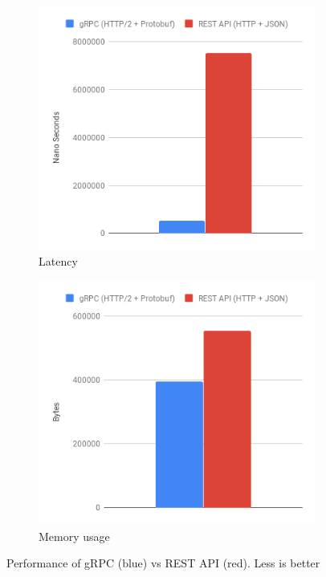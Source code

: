 \begin{figure}[h!]
        \centering
        \begin{subfigure}{.5\textwidth}
          \centering
          \includegraphics[width=\linewidth]{assets/images/grpc-vs-rest-time.png}
          \caption{Latency}
        \end{subfigure}%
        \begin{subfigure}{.5\textwidth}
          \centering
          \includegraphics[width=\linewidth]{assets/images/grpc-vs-rest-memory.png}
          \caption{Memory usage}
        \end{subfigure}
        \caption{Performance of gRPC (blue) vs REST API (red). Less is better}
        \label{fig:grpc-vs-rest}
    \end{figure}
    
